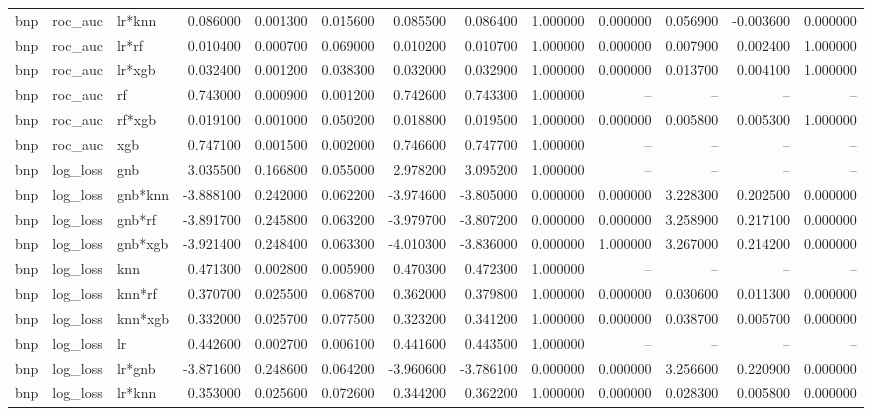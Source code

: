 \begin{landscape}
\begin{longtable}{lllrrrrrrrrrr}
bnp & roc\_auc & lr*knn & 0.086000 & 0.001300 & 0.015600 & 0.085500 & 0.086400 & 1.000000 & 0.000000 & 0.056900 & -0.003600 & 0.000000 \\
bnp & roc\_auc & lr*rf & 0.010400 & 0.000700 & 0.069000 & 0.010200 & 0.010700 & 1.000000 & 0.000000 & 0.007900 & 0.002400 & 1.000000 \\
bnp & roc\_auc & lr*xgb & 0.032400 & 0.001200 & 0.038300 & 0.032000 & 0.032900 & 1.000000 & 0.000000 & 0.013700 & 0.004100 & 1.000000 \\
bnp & roc\_auc & rf & 0.743000 & 0.000900 & 0.001200 & 0.742600 & 0.743300 & 1.000000 & -- & -- & -- & -- \\
bnp & roc\_auc & rf*xgb & 0.019100 & 0.001000 & 0.050200 & 0.018800 & 0.019500 & 1.000000 & 0.000000 & 0.005800 & 0.005300 & 1.000000 \\
bnp & roc\_auc & xgb & 0.747100 & 0.001500 & 0.002000 & 0.746600 & 0.747700 & 1.000000 & -- & -- & -- & -- \\
bnp & log\_loss & gnb & 3.035500 & 0.166800 & 0.055000 & 2.978200 & 3.095200 & 1.000000 & -- & -- & -- & -- \\
bnp & log\_loss & gnb*knn & -3.888100 & 0.242000 & 0.062200 & -3.974600 & -3.805000 & 0.000000 & 0.000000 & 3.228300 & 0.202500 & 0.000000 \\
bnp & log\_loss & gnb*rf & -3.891700 & 0.245800 & 0.063200 & -3.979700 & -3.807200 & 0.000000 & 0.000000 & 3.258900 & 0.217100 & 0.000000 \\
bnp & log\_loss & gnb*xgb & -3.921400 & 0.248400 & 0.063300 & -4.010300 & -3.836000 & 0.000000 & 1.000000 & 3.267000 & 0.214200 & 0.000000 \\
bnp & log\_loss & knn & 0.471300 & 0.002800 & 0.005900 & 0.470300 & 0.472300 & 1.000000 & -- & -- & -- & -- \\
bnp & log\_loss & knn*rf & 0.370700 & 0.025500 & 0.068700 & 0.362000 & 0.379800 & 1.000000 & 0.000000 & 0.030600 & 0.011300 & 0.000000 \\
bnp & log\_loss & knn*xgb & 0.332000 & 0.025700 & 0.077500 & 0.323200 & 0.341200 & 1.000000 & 0.000000 & 0.038700 & 0.005700 & 0.000000 \\
bnp & log\_loss & lr & 0.442600 & 0.002700 & 0.006100 & 0.441600 & 0.443500 & 1.000000 & -- & -- & -- & -- \\
bnp & log\_loss & lr*gnb & -3.871600 & 0.248600 & 0.064200 & -3.960600 & -3.786100 & 0.000000 & 0.000000 & 3.256600 & 0.220900 & 0.000000 \\
bnp & log\_loss & lr*knn & 0.353000 & 0.025600 & 0.072600 & 0.344200 & 0.362200 & 1.000000 & 0.000000 & 0.028300 & 0.005800 & 0.000000 \\

\end{longtable}
\end{landscape}
